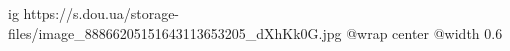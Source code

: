  
 
 
 
 

\ifcmt
  ig https://s.dou.ua/storage-files/image_88866205151643113653205_dXhKk0G.jpg
	@wrap center
	@width 0.6
\fi
